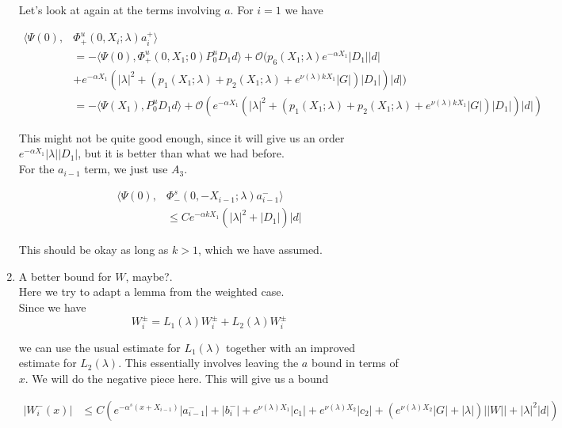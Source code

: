 \documentclass[12pt]{article}
\begin{document}
\begin{enumerate}
Let's look at again at the terms involving $a$. For $i = 1$ we have

\begin{align*}
\langle \Psi(0), &\Phi^u_+(0, X_i; \lambda) a_i^+ \rangle \\
&= -\langle \Psi(0), \Phi^u_+(0, X_1; 0) P^u_0 D_1 d \rangle + \mathcal{O}( p_6(X_1; \lambda) e^{-\alpha X_1}|D_1||d| \\
&+ e^{-\alpha X_1} (|\lambda|^2 + (p_1(X_1; \lambda) + p_2(X_1; \lambda) + e^{\nu(\lambda) k X_1} |G|)|D_1|) |d|) \\
&= -\langle \Psi(X_1), P^u_0 D_1 d \rangle + \mathcal{O}( e^{-\alpha X_1}( |\lambda|^2 + (p_1(X_1; \lambda) + p_2(X_1; \lambda) + e^{\nu(\lambda) k X_1} |G|)|D_1|)|d|)
\end{align*}

This might not be quite good enough, since it will give us an order $e^{-\alpha X_1} |\lambda||D_1|$, but it is better than what we had before.\\

For the $a_{i-1}$ term, we just use $A_3$.

\begin{align*}
\langle \Psi(0), &\Phi^s_-(0, -X_{i-1}; \lambda)a_{i-1}^- \rangle \\
&\leq C e^{-\alpha k X_1} ( |\lambda|^2 + |D_1|) |d|
\end{align*}

This should be okay as long as $k > 1$, which we have assumed.\\

\item A better bound for $W$, maybe?.\\

Here we try to adapt a lemma from the weighted case.\\

Since we have 
\[
W_i^\pm = L_1(\lambda)W_i^\pm + L_2(\lambda)W_i^\pm 
\]

we can use the usual estimate for $L_1(\lambda)$ together with an improved estimate for $L_2(\lambda)$. This essentially involves leaving the $a$ bound in terms of $x$. We will do the negative piece here. This will give us a bound 

\begin{align*}
| W_i^-(x)| &\leq C \left( e^{-\alpha^s(x + X_{i-1})} |a^-_{i-1}| + |b_i^-| + e^{\nu(\lambda)X_1}|c_1| + e^{\nu(\lambda)X_2}|c_2| + (e^{\nu(\lambda)X_2} |G| + |\lambda|)||W|| + |\lambda|^2 |d|  \right)
\end{align*}


\end{enumerate}
\end{document}

